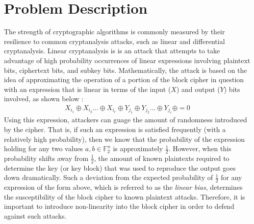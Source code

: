 \documentclass[11pt]{article}
\newcommand{\field}[1]{\mathbb{#1}} %
\begin{document}
\section{Problem Description}
The strength of cryptographic algorithms is commonly measured by their resilience to common cryptanalysis attacks, such as linear and differential cryptanalysis. Linear cryptanalysis is is an attack that attempts to take advantage of high probability occurrences of linear expressions involving plaintext bits, ciphertext bits, and subkey bits. Mathematically, the attack is based on the idea of approximating the operation of a portion of the block cipher in question with an expression that is linear in terms of the input ($X$) and output ($Y$) bits involved, as shown below \cite{Heys01atutorial}:
\begin{eqnarray*}
X_{i_{1}} \oplus X_{i_{2}} ... \oplus X_{i_{r}} \oplus Y_{j_{1}} \oplus Y_{j_{2}} ... \oplus Y_{j_{s}} \oplus  = 0
\end{eqnarray*}
Using this expression, attackers can guage the amount of randomness introduced by the cipher. That is, if such an expression is satisfied frequently (with a relatively high probability), then we know that the probability of the expression holding for any two values $a,b\in \field{F}_2^n$ is approximately $\frac{1}{2}$. However, when this probability shifts away from $\frac{1}{2}$, the amount of known plaintexts required to determine the key (or key block) that was used to reproduce the output goes down dramatically. Such a deviation from the expected probability of $\frac{1}{2}$ for any expression of the form above, which is referred to as the \emph{linear bias}, determines the susceptibility of the block cipher to known plaintext attacks. Therefore, it is important to introduce non-linearity into the block cipher in order to defend against such attacks.
\end{document}
